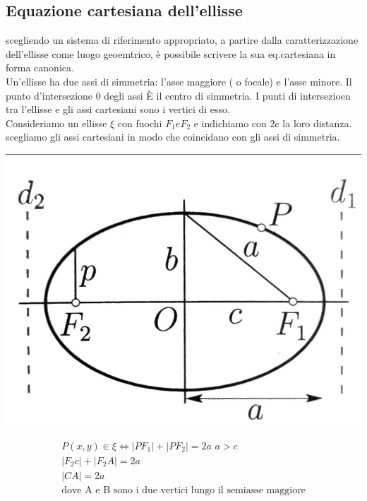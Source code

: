 \documentclass[a4paper,11pt]{article}
\begin{document}
      \subsection{Equazione cartesiana dell'ellisse}
scegliendo un sistema di riferimento appropriato, a partire dalla caratterizzazione dell'ellisse come luogo geoemtrico, è possibile scrivere la sua eq.cartesiana in forma canonica.
\\
Un'ellisse ha due assi di simmetria: l'asse maggiore ( o focale) e l'asse minore. Il punto d'intersezione 0 degli assi È il centro di simmetria. I punti di intersezioen tra l'ellisse e gli assi cartesiani sono i vertici di esso.
\\
Consideriamo un ellisse \( \xi  \) con fuochi \(F_1 e F_2\) e indichiamo con 2c la loro distanza. scegliamo gli assi cartesiani in modo che coincidano con gli assi di simmetria. 

\begin{center}
    \begin{minipage}{8cm}
        \includegraphics[scale=0.3]{ellisseg.png}
    \end{minipage}
    \end{center}

\begin{align*}
 P(x,y) \in \xi \Longleftrightarrow \left\lvert PF_1 \right\rvert + \left\lvert PF_2 \right\rvert = 2a \, \, a > c 
 \\
 \left\lvert F_2c \right\rvert + \left\lvert F_2A \right\rvert = 2a
 \\
 \left\lvert CA \right\rvert = 2a
 \\
 \text{dove A e B sono i due vertici lungo il semiasse maggiore}
\end{align*}
\end{document}
